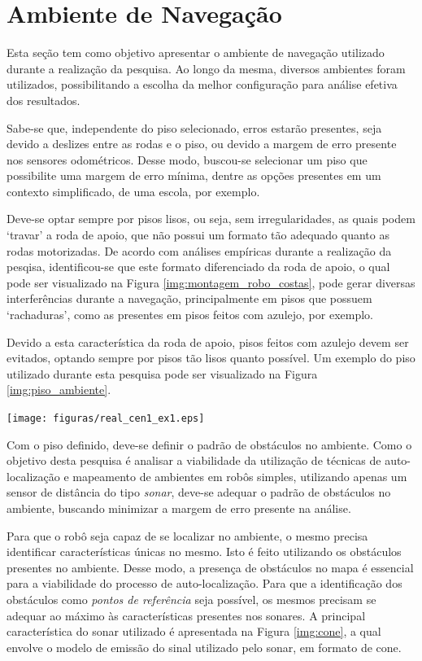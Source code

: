 \section{Ambiente de Navegação}

	Esta seção tem como objetivo apresentar o ambiente de navegação utilizado durante a realização da pesquisa. Ao longo da mesma, diversos ambientes foram utilizados, possibilitando a escolha da melhor configuração para análise efetiva dos resultados.

	Sabe-se que, independente do piso selecionado, erros estarão presentes, seja devido a deslizes entre as rodas e o piso, ou devido a margem de erro presente nos sensores odométricos. Desse modo, buscou-se selecionar um piso que possibilite uma margem de erro mínima, dentre as opções presentes em um contexto simplificado, de uma escola, por exemplo.

	Deve-se optar sempre por pisos lisos, ou seja, sem irregularidades, as quais podem `travar' a roda de apoio, que não possui um formato tão adequado quanto as rodas motorizadas. De acordo com análises empíricas durante a realização da pesqisa,
	identificou-se que este formato diferenciado da roda de apoio, o qual pode ser visualizado na Figura \ref{img:montagem_robo_costas}, pode gerar diversas interferências durante a navegação, principalmente em pisos que possuem `rachaduras', como as presentes em pisos feitos com azulejo, por exemplo.

	Devido a esta característica da roda de apoio, pisos feitos com azulejo devem ser evitados, optando sempre por pisos tão lisos quanto possível. Um exemplo do piso utilizado durante esta pesquisa pode ser visualizado na Figura \ref{img:piso_ambiente}.

	{\centering
	\texttt{[image: figuras/real\_cen1\_ex1.eps]}
	\label{img:piso_ambiente}
	\par}

	Com o piso definido, deve-se definir o padrão de obstáculos no ambiente. Como o objetivo desta pesquisa é analisar a viabilidade da utilização de técnicas de auto-localização e mapeamento de ambientes em robôs simples, utilizando apenas um sensor de distância do tipo \textit{sonar}, deve-se adequar o padrão de obstáculos no ambiente, buscando minimizar a margem de erro presente na análise.

	Para que o robô seja capaz de se localizar no ambiente, o mesmo precisa identificar características únicas no mesmo. Isto é feito utilizando
	os obstáculos presentes no ambiente. Desse modo, a presença de obstáculos no mapa é essencial para a viabilidade do processo de
	auto-localização. Para que a identificação dos obstáculos como \textit{pontos de referência} seja possível, os mesmos precisam
	se adequar ao máximo às características presentes nos sonares. A principal característica do sonar utilizado é apresentada na
	Figura \ref{img:cone}, a qual envolve o modelo de emissão do sinal utilizado pelo sonar, em formato de cone.

